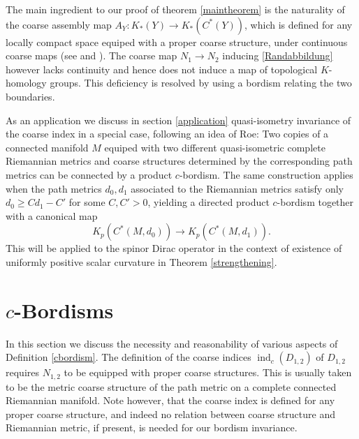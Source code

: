 \documentclass[a4paper]{amsproc}
\theoremstyle{definition}
\theoremstyle{remark}
\numberwithin{equation}{section}
\begin{document}
The main ingredient to our proof of theorem \ref{maintheorem} is the naturality of the coarse assembly map $A_Y:K_*(Y)\to K_*(C^*(Y))$, which is defined for any locally compact space equiped with a proper coarse structure, under continuous coarse maps (see \cite[Chapter 12]{MR1817560} and \cite{MR1451755}). The coarse map $N_1\to N_2$ inducing
\ref{Randabbildung} however lacks continuity and hence does not induce a map of topological $K$-homology groups. This deficiency is resolved by using a bordism relating the two boundaries.

As an application we discuss in section \ref{application} quasi-isometry invariance of the coarse index in a special case, following an idea of Roe: Two copies of a connected manifold $M$ equiped with two different quasi-isometric complete Riemannian metrics and coarse structures
determined by the corresponding path metrics can be connected by a product $c$-bordism. The same
construction applies when the path metrics $d_0,d_1$ associated to the Riemannian metrics satisfy only $d_0\geq Cd_1-C'$ for some $C,C'>0$, yielding a directed product $c$-bordism together with a canonical map \begin{equation*}
K_p(C^*(M,d_0))\to K_p(C^*(M,d_1)).
\end{equation*}
This will be applied to the spinor Dirac operator in the context of existence of uniformly positive scalar curvature in Theorem
\ref{strengthening}.

\section{$c$-Bordisms}\label{cbordisms}
In this section we discuss the necessity and reasonability of various aspects of Definition \ref{cbordism}.
The definition of the coarse
indices $\operatorname{ind}_c(D_{1,2})$ of $D_{1,2}$
requires $N_{1,2}$ to be equipped with proper coarse structures.  This is usually taken to
be the metric coarse structure of the path metric on a complete connected Riemannian manifold.
Note however, that the coarse index is defined for any proper coarse structure, and indeed no relation between coarse structure and Riemannian metric, if present, is needed for our bordism invariance.
\end{document}
